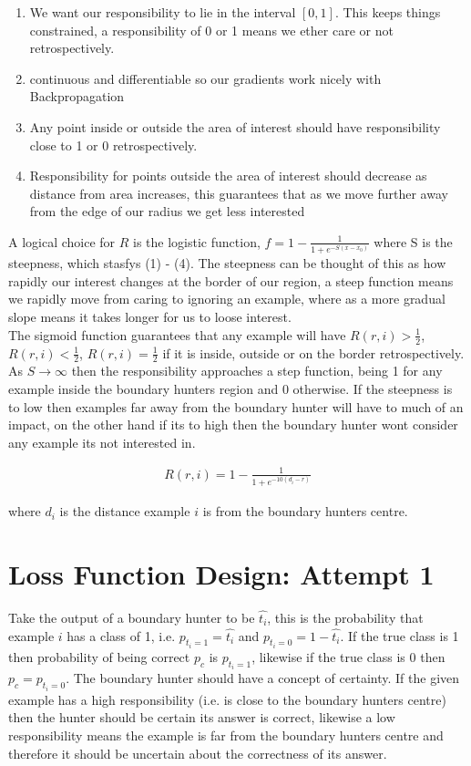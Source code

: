 \documentclass[notitlepage]{report}
\theoremstyle{definition}
\begin{document}
\begin{enumerate}
	\item We want our responsibility to lie in the interval $[0, 1]$. This keeps things constrained, a responsibility of 0 or 1 means we ether care or not retrospectively.
	\item continuous and differentiable so our gradients work nicely with Backpropagation
	\item Any point inside or outside the area of interest should have responsibility close to 1 or 0 retrospectively.
	\item Responsibility for points outside the area of interest should decrease as distance from area increases, this guarantees that as we move further away from the edge of our radius we get less interested
\end{enumerate}

A logical choice for $R$ is the logistic function, $f = 1 - \frac{1}{1 + e^{-S(x - x_0)}}$ where S is the steepness, which stasfys (1) - (4). The steepness can be thought of this as how rapidly our interest changes at the border of our region, a steep function means we rapidly move from caring to ignoring an example, where as a more gradual slope means it takes longer for us to loose interest.\\

The sigmoid function guarantees that any example will have $R(r, i) > \frac{1}{2}$, $R(r, i) < \frac{1}{2}$, $R(r, i) = \frac{1}{2}$ if it is inside, outside or on the border retrospectively. As $S \rightarrow \infty$ then the responsibility approaches a step function, being 1 for any example inside the boundary hunters region and 0 otherwise. If the steepness is to low then examples far away from the boundary hunter will have to much of an impact, on the other hand if its to high then the boundary hunter wont consider any example its not interested in. 

\begin{align}
R(r, i) = 1 - \frac{1}{1 + e^{-10(d_i-r)}}
\label{equ:responsibility}
\end{align}

where $d_i$ is the distance example $i$ is from the boundary hunters centre.

\section{Loss Function Design: Attempt 1}
Take the output of a boundary hunter to be $\widehat{t_i}$, this is the probability that example $i$ has a class of 1, i.e. $p_{t_i=1} = \widehat{t_i}$ and $p_{t_i=0} = 1 - \widehat{t_i}$. If the true class is 1 then probability of being correct $p_c$ is $p_{t_i=1}$, likewise if the true class is 0 then $p_c = p_{t_i=0}$. The boundary hunter should have a concept of certainty. If the given example has a high responsibility (i.e. is close to the boundary hunters centre) then the hunter should be certain its answer is correct, likewise a low responsibility means the example is far from the boundary hunters centre and therefore it should be uncertain about the correctness of its answer.\\
\end{document}
